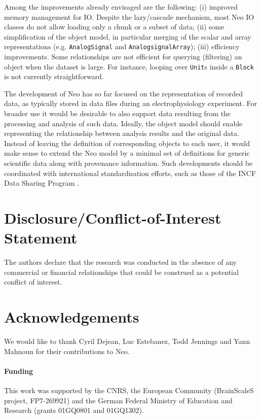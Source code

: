 \documentclass{frontiers}
\begin{document}
Among the improvements already envisaged are the following:
(i) improved memory management for IO. Despite the lazy/cascade mechanism, most Neo IO classes do not allow loading only a chunk or a subset of data;
(ii) some simplification of the object model, in particular merging of the scalar and array representations (e.g. \lstinline`AnalogSignal` and \lstinline`AnalogsignalArray`);
(iii) efficiency improvements. Some relationships are not efficient for querying (filtering) an object when the dataset is large. For instance, looping over \lstinline`Unit`s inside a \lstinline`Block` is not currently straightforward.

The development of Neo has so far focused on the representation of recorded data, as typically stored in data files during an electrophysiology experiment.
For broader use it would be desirable to also support data resulting from the processing and analysis of such data.
Ideally, the object model should enable representing the relationship between analysis results and the original data.
Instead of leaving the definition of corresponding objects to each user, it would make sense to extend the Neo model by a minimal set of definitions for generic scientific data along with provenance information.
Such developments should be coordinated with international standardisation efforts, such as those of the INCF Data Sharing Program \citep{Teeters2013}.

\section*{Disclosure/Conflict-of-Interest Statement}
The authors declare that the research was conducted in the absence of any commercial or financial relationships that could be construed as a potential conflict of interest.

\section*{Acknowledgements}
We would like to thank Cyril Dejean, Luc Estebanez, Todd Jennings and Yann Mahnoun for their contributions to Neo.

\paragraph{Funding\textcolon} This work was supported by the CNRS, the European Community (BrainScaleS project, FP7-269921) and the German Federal Ministry of Education and Research (grants 01GQ0801 and 01GQ1302).


\end{document}
